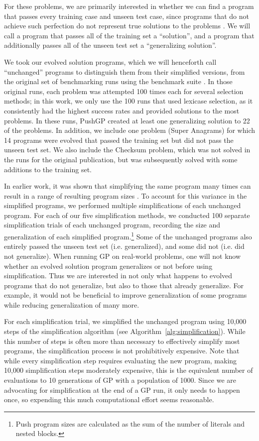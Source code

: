 For these problems, we are primarily interested in whether we can find a program that passes every training case and unseen test case, since programs that do not achieve such perfection do not represent true solutions to the problems \cite{Helmuth:2015:GECCO}. We will call a program that passes all of the training set a ``solution'', and a program that additionally passes all of the unseen test set a ``generalizing solution''.

We took our evolved solution programs, which we will henceforth call ``unchanged'' programs to distinguish them from their simplified versions, from the original set of benchmarking runs using the benchmark suite \cite{Helmuth:2015:GECCO}. In those original
runs, each problem was attempted 100 times each for several selection methods;
in this work, we only use the 100 runs that used lexicase selection, as it
consistently had the highest success rates and provided solutions to the most problems. 
In these runs, PushGP created at least one generalizing solution to 22 of the problems. In addition, we include one problem (Super Anagrams) for which 14 programs were evolved that passed the training set but did not pass the unseen test set. We also include the Checksum problem, which was not solved in the runs for the original publication, but was subsequently solved with some additions to the training set.

In earlier work, it was shown that simplifying the same program many times can result in a range of resulting program sizes \cite{Spector:2014:GECCOcomp}. To account for this variance in the simplified programs, we performed multiple simplifications of each unchanged program. For each of our five simplification methods, we conducted 100 separate simplification trials of each unchanged program, recording the size and generalization of each simplified program.\footnote{Push program sizes are calculated as the sum of the number of literals and nested blocks.}
Some of the unchanged programs also entirely passed the 
unseen test set (i.e. generalized), and some did not (i.e. did not generalize). When running GP on real-world problems, one will not know whether an evolved solution program generalizes or not before using simplification. Thus we are interested in not only what happens to evolved programs that do not generalize, but also to those that already generalize. For example, it would not be beneficial to improve generalization of some programs while reducing generalization of many more.

For each simplification trial, we simplified the unchanged program using 10,000 steps of the simplification algorithm (see Algorithm~\ref{alg:simplification}). 
While this number of steps is often more than necessary to effectively 
simplify most programs, the simplification process is not prohibitively expensive. Note that while every simplification step requires evaluating the new program, making 10,000 simplification steps moderately expensive, this is the equivalent number of evaluations to 10 generations of GP with a population of 1000. Since we are advocating for simplification at the end of a GP run, it only needs to happen once, 
so expending this much computational effort seems reasonable.

